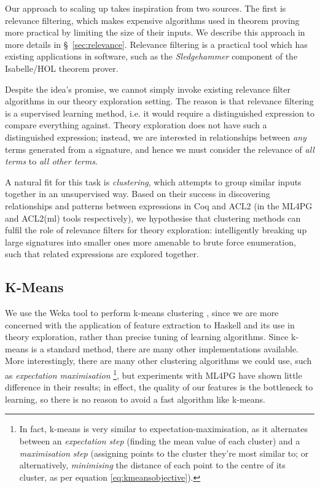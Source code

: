 Our approach to scaling up \qspec{} takes inspiration from two sources. The
first is relevance filtering, which makes expensive algorithms used in theorem
proving more practical by limiting the size of their inputs. We describe this
approach in more details in \S~\ref{sec:relevance}. Relevance filtering is a
practical tool which has existing applications in software, such as the
\emph{Sledgehammer} component of the Isabelle/HOL theorem prover.

Despite the idea's promise, we cannot simply invoke existing relevance filter
algorithms in our theory exploration setting. The reason is that relevance
filtering is a supervised learning method, i.e. it would require a distinguished
expression to compare everything against. Theory exploration does not have such
a distinguished expression; instead, we are interested in relationships between
\emph{any} terms generated from a signature, and hence we must consider the
relevance of \emph{all terms} to \emph{all other terms}.

A natural fit for this task is \emph{clustering}, which attempts to group
similar inputs together in an unsupervised way. Based on their success in
discovering relationships and patterns between expressions in Coq and ACL2 (in
the ML4PG and ACL2(ml) tools respectively), we hypothesise that clustering
methods can fulfil the role of relevance filters for theory exploration:
intelligently breaking up large signatures into smaller ones more amenable to
brute force enumeration, such that related expressions are explored together.

\subsection{K-Means}

We use the Weka tool to perform k-means clustering
\cite{Holmes.Donkin.Witten:1994}, since we are more concerned with the
application of feature extraction to Haskell and its use in theory exploration,
rather than precise tuning of learning algorithms. Since k-means is a standard
method, there are many other implementations available. More interestingly,
there are many other clustering algorithms we could use, such as
\emph{expectation maximisation} \footnote{In fact, k-means is very similar to
  expectation-maximisation, as it alternates between an \emph{expectation step}
  (finding the mean value of each cluster) and a \emph{maximisation step}
  (assigning points to the cluster they're most similar to; or alternatively,
  \emph{minimising} the distance of each point to the centre of its cluster, as
  per equation \ref{eq:kmeansobjective}).}, but experiments with ML4PG have
shown little difference in their results; in effect, the quality of our features
is the bottleneck to learning, so there is no reason to avoid a fast algorithm
like k-means.

